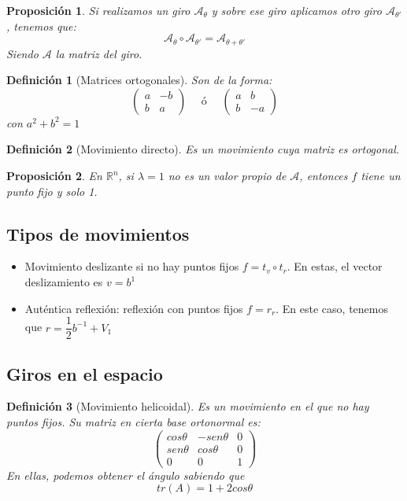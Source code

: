 \documentclass[11pt, a4paper, titlepage]{article}
\newcommand{\R}{\mathbb{R}}
\theoremstyle{theorem-style}
\newtheorem*{nprop}{Proposición}
\theoremstyle{definition-style}
\newtheorem*{ndef}{Definición}
\theoremstyle{remark-style}
\theoremstyle{example-style}
\begin{document}
\begin{nprop}
	Si realizamos un giro $\mathcal A_\theta$ y sobre ese giro aplicamos otro giro $\mathcal A_{\theta'}$, tenemos que:
	\[
	\mathcal A_{\theta} \circ \mathcal A_{\theta'} = \mathcal A_{\theta+\theta'}
	\]
	Siendo $\mathcal A$ la matriz del giro.
\end{nprop}

\begin{ndef}[Matrices ortogonales]
	Son de la forma:
	\[
	\begin{pmatrix}
 a & -b \\
 b & a 
\end{pmatrix} \quad \text { ó } \quad \begin{pmatrix}
 a & b \\
 b & -a 
\end{pmatrix}
	\]
	con $a^2+b^2 = 1$
\end{ndef}

\begin{ndef}[Movimiento directo]
	Es un movimiento cuya matriz es ortogonal. 
\end{ndef}
\begin{nprop}
	En $\R^n$, si $\lambda = 1$ no es un valor propio de $\mathcal A$, entonces $f$ tiene un punto fijo y solo 1.
\end{nprop}

\subsection{Tipos de movimientos}
\begin{itemize}
	\item Movimiento deslizante si no hay puntos fijos $f = t_v \circ t_r$. En estas, el vector deslizamiento es $v=b^1$
	\item Auténtica reflexión: reflexión con puntos fijos $f=r_r$. En este caso, tenemos que $r= \dfrac{1}{2}b^{-1}+V_1$
\end{itemize}

\subsection{Giros en el espacio}
\begin{ndef}[Movimiento helicoidal]
	Es un movimiento en el que no hay puntos fijos. Su matriz en cierta base ortonormal es:
	\[
	\begin{pmatrix}
cos \theta & -sen\theta & 0 \\
 sen \theta & cos\theta & 0\\
 0 & 0 & 1
\end{pmatrix} 
	\]
	En ellas, podemos obtener el ángulo sabiendo que 
	\[
	tr(A) = 1+2cos\theta
	\]
\end{ndef}
\end{document}

